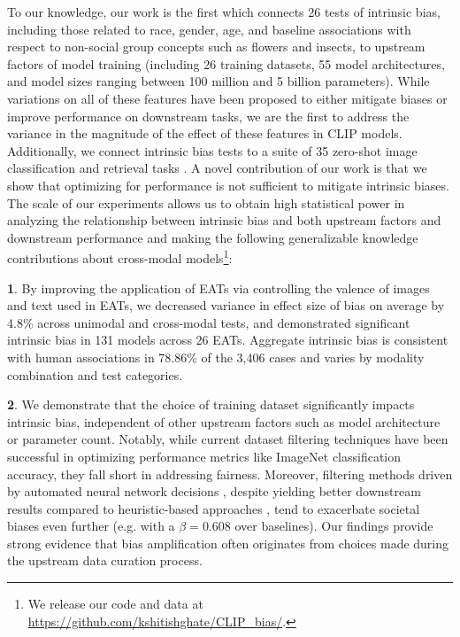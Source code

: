 To our knowledge, our work is the first which connects 26 tests of intrinsic bias, including those related to race, gender, age, and baseline associations with respect to non-social group concepts such as flowers and insects, to upstream factors of model training (including 26 training datasets, 55 model architectures, and model sizes ranging between 100 million and 5 billion parameters). While variations on all of these features have been proposed to either mitigate biases or improve performance on downstream tasks, we are the first to address the variance in the magnitude of the effect of these features in CLIP models. Additionally, we connect intrinsic bias tests to a suite of 35 zero-shot image classification and retrieval tasks \cite{Schuhmann2022LAION-5B:Models}. A novel contribution of our work is that we show that optimizing for performance is not sufficient to mitigate intrinsic biases. The scale of our experiments allows us to obtain high statistical power in analyzing the relationship between intrinsic bias and both upstream factors and downstream performance and making the following generalizable knowledge contributions about cross-modal models\footnote{We release our code and data at \url{https://github.com/kshitishghate/CLIP\_bias/}.}:

\textbf{1}. By improving the application of EATs via controlling the valence of images and text used in EATs, we decreased variance in effect size of bias on average by 4.8\% across unimodal and cross-modal tests, and demonstrated significant intrinsic bias in 131 models across 26 EATs. Aggregate intrinsic bias is consistent with human associations in 78.86\% of the 3,406 cases and varies by modality combination and test categories. 
    
\textbf{2}. We demonstrate that the choice of training dataset significantly impacts intrinsic bias, independent of other upstream factors such as model architecture or parameter count. Notably, while current dataset filtering techniques \cite{gadre2024datacomp, fang_data_2023, xu_demystifying_2023} have been successful in optimizing performance metrics like ImageNet classification accuracy, they fall short in addressing fairness. Moreover, filtering methods driven by automated neural network decisions \cite{fang_data_2023}, despite yielding better downstream results compared to heuristic-based approaches \cite{gadre2024datacomp}, tend to exacerbate societal biases even further (e.g. with a $\beta=0.608$ over baselines). Our findings provide strong evidence that bias amplification often originates from choices made during the upstream data curation process.

